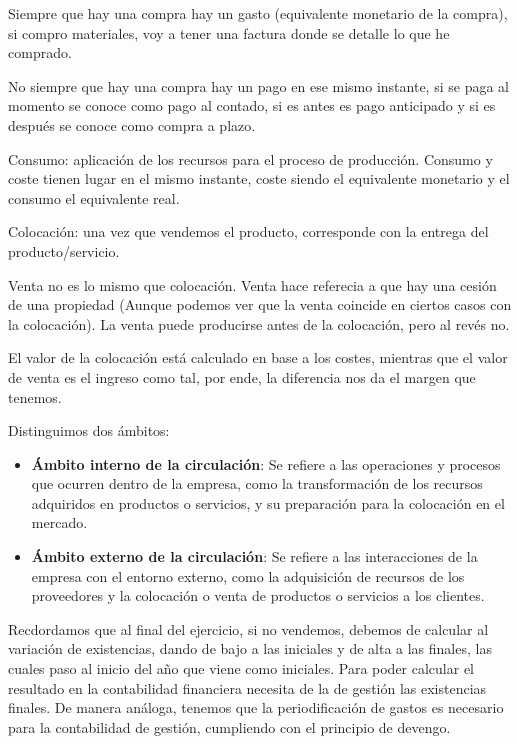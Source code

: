 \documentclass[12pt]{report} %
\begin{document}

Siempre que hay una compra hay un gasto (equivalente monetario de la
compra), si compro materiales, voy a tener una factura donde se detalle
lo que he comprado.

No siempre que hay una compra hay un pago en ese mismo instante, si se
paga al momento se conoce como pago al contado, si es antes es pago
anticipado y si es después se conoce como compra a plazo.

Consumo: aplicación de los recursos para el proceso de producción.
Consumo y coste tienen lugar en el mismo instante, coste siendo el
equivalente monetario y el consumo el equivalente real.

Colocación: una vez que vendemos el producto, corresponde con la entrega
del producto/servicio.

Venta no es lo mismo que colocación. Venta hace referecia a que hay una
cesión de una propiedad (Aunque podemos ver que la venta coincide en
ciertos casos con la colocación). La venta puede producirse antes de la
colocación, pero al revés no.

El valor de la colocación está calculado en base a los costes, mientras
que el valor de venta es el ingreso como tal, por ende, la diferencia
nos da el margen que tenemos.

Distinguimos dos ámbitos:

\begin{itemize}
\item
  \textbf{Ámbito interno de la circulación}: Se refiere a las
  operaciones y procesos que ocurren dentro de la empresa, como la
  transformación de los recursos adquiridos en productos o servicios, y
  su preparación para la colocación en el mercado.
\item
  \textbf{Ámbito externo de la circulación}: Se refiere a las
  interacciones de la empresa con el entorno externo, como la
  adquisición de recursos de los proveedores y la colocación o venta de
  productos o servicios a los clientes.
\end{itemize}

Recdordamos que al final del ejercicio, si no vendemos, debemos de
calcular al variación de existencias, dando de bajo a las iniciales y de
alta a las finales, las cuales paso al inicio del año que viene como
iniciales. Para poder calcular el resultado en la contabilidad
financiera necesita de la de gestión las existencias finales. De manera
análoga, tenemos que la periodificación de gastos es necesario para la
contabilidad de gestión, cumpliendo con el principio de devengo.
\end{document}
